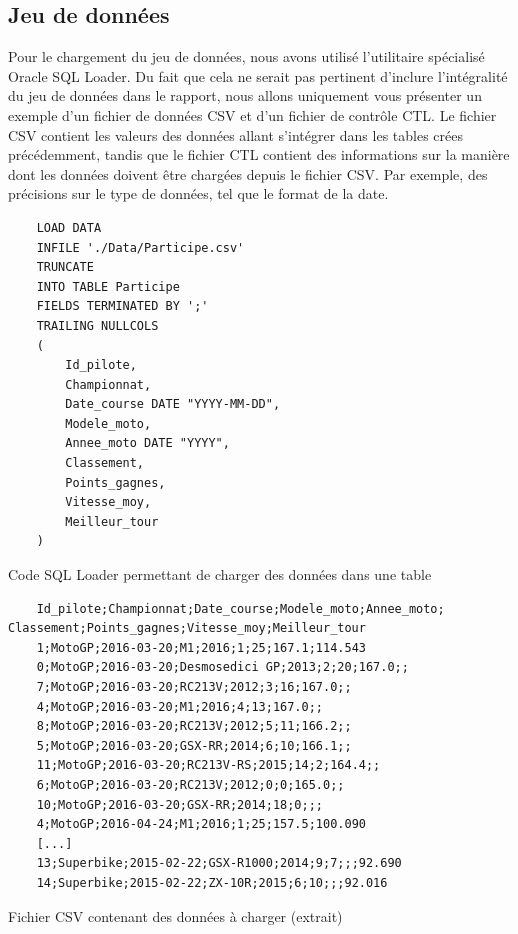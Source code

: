 \documentclass[12pt,a4paper]{article}
\newenvironment{code}{\captionsetup{type=listing}}{}
\begin{document}
\subsection{Jeu de données}
\label{sub.data}

Pour le chargement du jeu de données, nous avons utilisé l'utilitaire spécialisé
Oracle SQL Loader. Du fait que cela ne serait pas pertinent d’inclure
l’intégralité du jeu de données dans le rapport, nous allons uniquement vous
présenter un exemple d’un fichier de données CSV et d’un fichier de contrôle
CTL. Le fichier CSV contient les valeurs des données allant s’intégrer dans les
tables crées précédemment, tandis que le fichier CTL contient des informations
sur la manière dont les données doivent être chargées depuis le fichier CSV. Par
exemple, des précisions sur le type de données, tel que le format de la date.

\begin{code}
    \begin{verbatim}
    LOAD DATA
    INFILE './Data/Participe.csv'
    TRUNCATE
    INTO TABLE Participe
    FIELDS TERMINATED BY ';'
    TRAILING NULLCOLS
    (
        Id_pilote,
        Championnat,
        Date_course DATE "YYYY-MM-DD",
        Modele_moto,
        Annee_moto DATE "YYYY",
        Classement,
        Points_gagnes,
        Vitesse_moy,
        Meilleur_tour
    )
    \end{verbatim}
    \caption{Code SQL Loader permettant de charger des données dans une table}
    \label{lst.loadctl}
\end{code}

\begin{code}
    \begin{verbatim}
    Id_pilote;Championnat;Date_course;Modele_moto;Annee_moto; Classement;Points_gagnes;Vitesse_moy;Meilleur_tour
    1;MotoGP;2016-03-20;M1;2016;1;25;167.1;114.543
    0;MotoGP;2016-03-20;Desmosedici GP;2013;2;20;167.0;;
    7;MotoGP;2016-03-20;RC213V;2012;3;16;167.0;;
    4;MotoGP;2016-03-20;M1;2016;4;13;167.0;;
    8;MotoGP;2016-03-20;RC213V;2012;5;11;166.2;;
    5;MotoGP;2016-03-20;GSX-RR;2014;6;10;166.1;;
    11;MotoGP;2016-03-20;RC213V-RS;2015;14;2;164.4;;
    6;MotoGP;2016-03-20;RC213V;2012;0;0;165.0;;
    10;MotoGP;2016-03-20;GSX-RR;2014;18;0;;;
    4;MotoGP;2016-04-24;M1;2016;1;25;157.5;100.090
    [...]
    13;Superbike;2015-02-22;GSX-R1000;2014;9;7;;;92.690
    14;Superbike;2015-02-22;ZX-10R;2015;6;10;;;92.016
    \end{verbatim}
    \caption{Fichier CSV contenant des données à charger (extrait)}
    \label{lst.loadcsv}
\end{code}
\end{document}
